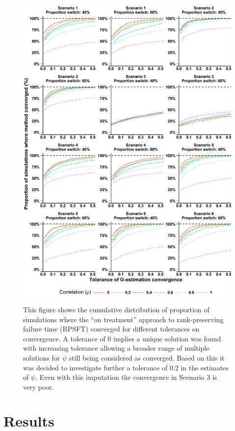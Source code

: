 \begin{figure}[ht]
\centering
\includegraphics[width=13cm]{images/chap_sim3/conv_cdf.png}
\caption{\label{F:chap_sim3:convcdf}  This figure shows the cumulative distribution of proportion of simulations where the ``on treatment'' approach to rank-preserving failure time (RPSFT) converged for different tolerances on convergence. A tolerance of 0 implies a unique solution was found with increasing tolerance allowing a broader range of multiple solutions for $\psi$ still being considered as converged. Based on this it was decided to investigate further a tolerance of 0.2 in the estimates of $\psi$. Even with this imputation the convergence in Scenario 3 is very poor.} 
\end{figure}

\clearpage

\section{Results}

